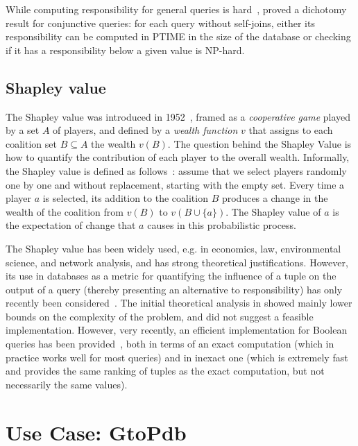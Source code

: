 \documentclass[preprint,12pt,sort&compress]{elsarticle}
\begin{document}
While computing responsibility for general queries is hard~\cite{ChocklerH04}, \citet{MeliouGMS11} proved a dichotomy result for conjunctive queries: for each query without self-joins, either its responsibility can be computed in PTIME in the size of the database or checking if it has a responsibility below a given value is NP-hard.

\subsection{Shapley value}
The Shapley value was introduced in 1952~\cite{Shapley1954}, framed as a \emph{cooperative game} played by a set $A$ of players, and defined by a \emph{wealth function} $v$ that assigns to each coalition set $B \subseteq A$ the wealth $v(B)$.
The question behind the Shapley Value is how to quantify the contribution of each player to the overall wealth. 
Informally, the Shapley value is defined as follows~\cite{LivshitsBKS20}: assume that we select players randomly one by one and without replacement, starting with the empty set. Every time a player $a$ is selected, its addition to the coalition $B$ produces a change in the wealth of the coalition from $v(B)$ to $v(B \cup \{a\})$. The Shapley value of $a$ is the expectation of change that $a$ causes in this probabilistic process.

The Shapley value has been widely used, e.g. in economics, law, environmental science, and network analysis, and has strong theoretical justifications. However, its use in databases as a metric for quantifying the influence of a tuple on the output of a query (thereby presenting an alternative to responsibility)  has only recently been considered~\cite{LivshitsBKS20}. 
The initial theoretical analysis in \cite{LivshitsBKS20} showed mainly lower bounds on the complexity of the problem, and did not suggest a feasible implementation.
However, very recently, an efficient implementation for Boolean queries has been provided~\cite{DFKM22}, both in terms of an exact computation (which in practice works well for most queries) and in inexact one (which is extremely fast and provides the same ranking of tuples as the exact computation, but not necessarily the same values).


\section{Use Case: GtoPdb}
\label{section:use_case}
\end{document}
